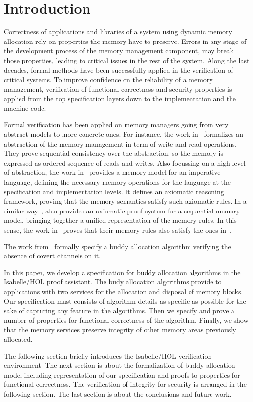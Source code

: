 
\section{Introduction}
Correctness of applications and libraries of a system using dynamic memory allocation rely on properties the memory have to preserve. Errors in any stage of the development process of the memory management component, may break those properties, leading to critical issues in the rest of the system. Along the last decades, formal methods have been successfully applied in the verification of critical systems. To improve confidence on the reliability of a memory management, verification of functional correctness and security properties is applied from the top specification layers down to the implementation and the machine code. 

Formal verification has been applied on memory managers going from very abstract models to more concrete ones. For instance, the work in~\cite{reg_higham} formalizes an abstraction of the memory management in term of write and read operations. They prove sequential consistency over the abstraction, so the memory is expressed as ordered sequence of reads and writes. Also focussing on a high level of abstraction, the work in~\cite{reg_blazy} provides a memory model for an imperative language, defining the necessary memory operations for the language at the specification and implementation levels. It defines an axiomatic reasoning framework, proving that the memory semantics satisfy such axiomatic rules. In a similar way~\cite{reg_mansky}, also provides an axiomatic proof system for a sequential memory model, bringing together a unified representation of the memory rules. In this sense, the work in~\cite{reg_mansky} proves that their memory rules also satisfy the ones in~\cite{reg_blazy}.


The work from~\cite{reg_peter} formally specify a buddy allocation algorithm verifying the absence of covert channels on it.


In this paper, we develop a specification for buddy allocation algorithms in the Isabelle/HOL proof assistant. The budy allocation algorithms provide to applications with two services for the allocation and disposal of memory blocks. Our specification must consists of algorithm details as specific as possible for the sake of capturing any feature in the algorithms. Then we specify and prove a number of properties for functional correctness of the algorithm. Finally, we show that the memory services preserve integrity of other memory areas previously allocated.

The following section briefly introduces the Isabelle/HOL verification environment. The next section is about the formalization of buddy allocation model including representation of our specification and proofs to properties for functional correctness. The verification of integrity for security is arranged in the following section. The last section is about the conclusions and future work.


